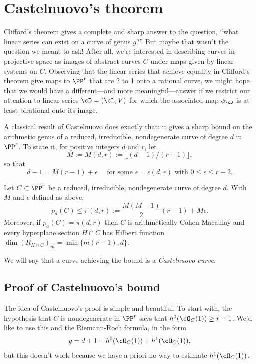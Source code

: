  \section{Castelnuovo's theorem}\label{CastelnuovoSection}

Clifford's theorem gives a complete and sharp answer to the question, ``what linear series can exist on a curve of genus $g$?''
But maybe that wasn't the question we meant to ask! After all, we're interested in describing curves in projective space as images of abstract curves $C$ under maps given by linear systems on $C$. Observing that the linear series that achieve equality in Clifford's theorem give maps to $\PP^r$ that are 2 to 1 onto a rational curve, we might hope that we would have a different---and more meaningful---answer if we  restrict our attention to linear series $\cD = (\cL,V)$ for which the associated map $\phi_\cD$ is at least  birational onto its image. 

A classical result of Castelnuovo does exactly that: it gives a sharp bound on the arithmetic genus of a reduced, irreducible, nondegenerate curve of degree $d$ in $\PP^r$. To state it, for positive integers $d$ and $r$, let 
$$
M := M(d,r) := \lfloor(d-1)/(r-1)\rfloor,
$$
so that
$$
 d -1 = M(r-1) + \epsilon \quad \text{ for some $\epsilon = \epsilon(d,r)$ with }0 \leq \epsilon \leq r-2. 
$$

\begin{theorem}\label{Castelnuovo's bound}
Let $C \subset \PP^r$ be a reduced, irreducible, nondegenerate curve of degree $d$. With $M$ and $\epsilon$ defined
as above,
$$
p_a(C) \leq \pi(d,r) := \frac{M(M-1)}{2}(r-1) + M\epsilon.
$$
Moreover, if $p_a(C) = \pi(d,r)$  then $C$ is arithmetically Cohen-Macaulay and every hyperplane
section $H\cap C$ has Hilbert function
$
\dim (R_{H\cap C})_{m} = \min\{m(r-1), d\}.
$
\end{theorem}

We will say that a curve achieving the bound is a \emph{Castelnuovo curve}.  

\subsection{Proof of Castelnuovo's bound}

The idea of Castelnuovo's proof is simple and beautiful. To start with, the hypothesis that $C$ is nondegenerate in $\PP^r$ says that $h^0(\cO_C(1)) \geq r+1$. We'd like to use this and the Riemann-Roch formula, in the form
$$
g = d+1 - h^0(\cO_C(1)) + h^1(\cO_C(1)),
$$
but this doesn't work because we have a priori no way to estimate $h^1(\cO_C(1))$.

